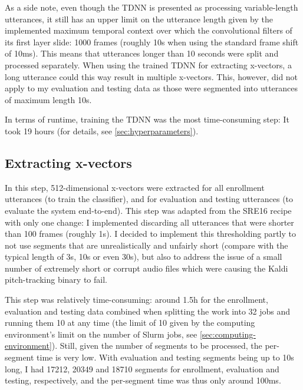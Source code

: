 \documentclass[bsc,frontabs,twoside,singlespacing,parskip,deptreport]{infthesis}
\begin{document}
{{{      As a side note, even though the TDNN is presented as processing variable-length utterances, it still has an upper limit on the utterance length given by the implemented maximum temporal context over which the convolutional filters of its first layer slide: 1000 frames (roughly 10s when using the standard frame shift of 10ms). This means that utterances longer than 10 seconds were split and processed separately. When using the trained TDNN for extracting x-vectors, a long utterance could this way result in multiple x-vectors. This, however, did not apply to my evaluation and testing data as those were segmented into utterances of maximum length 10s.
      
      In terms of runtime, training the TDNN was the most time-consuming step: It took 19 hours (for details, see \autoref{sec:hyperparameters}).
    }

    \subsection{Extracting x-vectors}{
      \label{sec:extracting-x-vectors}
      In this step, 512-dimensional x-vectors were extracted for all enrollment utterances (to train the classifier), and for evaluation and testing utterances (to evaluate the system end-to-end).
      This step was adapted from the SRE16 recipe with only one change: I implemented discarding all utterances that were shorter than 100 frames (roughly 1s). I decided to implement this thresholding partly to not use segments that are unrealistically and unfairly short (compare with the typical length of 3s, 10s or even 30s), but also to address the issue of a small number of extremely short or corrupt audio files which were causing the Kaldi pitch-tracking binary to fail.

      This step was relatively time-consuming: around 1.5h for the enrollment, evaluation and testing data combined when splitting the work into 32 jobs and running them 10 at any time (the limit of 10 given by the computing environment's limit on the number of Slurm jobs, see \autoref{sec:computing-environment}). Still, given the number of segments to be processed, the per-segment time is very low. With evaluation and testing segments being up to 10s long, I had 17212, 20349 and 18710 segments for enrollment, evaluation and testing, respectively, and the per-segment time was thus only around 100ms.
    }

}}
\end{document}
